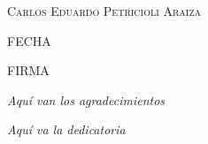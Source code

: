 \begin{center}

\bigskip

\bigskip

\bigskip

\scshape Carlos Eduardo Petricioli Araiza

\vfill

\makebox[3.5 in]{\hrulefill}

\bigskip

FECHA

\bigskip

\bigskip

\bigskip

\makebox[3.5 in]{\hrulefill}

\bigskip

FIRMA
\end{center}

\newpage

\thispagestyle{plain}


\begin{flushright}
\textit{Aquí van los agradecimientos}

\end{flushright}

\newpage

\thispagestyle{plain}



\begin{flushright}
\textit{Aquí va la dedicatoria}

\end{flushright}


\tableofcontents
\thispagestyle{plain}

\listoffigures
\thispagestyle{plain}

\listoftables
\newpage

